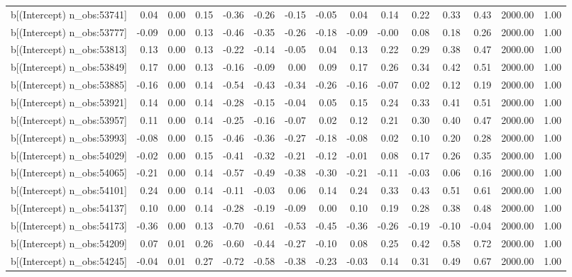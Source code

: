 \begin{table}[ht]
\begin{tabular}{rrrrrrrrrrrrrrr}
  b[(Intercept) n\_obs:53741] & 0.04 & 0.00 & 0.15 & -0.36 & -0.26 & -0.15 & -0.05 & 0.04 & 0.14 & 0.22 & 0.33 & 0.43 & 2000.00 & 1.00 \\ 
  b[(Intercept) n\_obs:53777] & -0.09 & 0.00 & 0.13 & -0.46 & -0.35 & -0.26 & -0.18 & -0.09 & -0.00 & 0.08 & 0.18 & 0.26 & 2000.00 & 1.00 \\ 
  b[(Intercept) n\_obs:53813] & 0.13 & 0.00 & 0.13 & -0.22 & -0.14 & -0.05 & 0.04 & 0.13 & 0.22 & 0.29 & 0.38 & 0.47 & 2000.00 & 1.00 \\ 
  b[(Intercept) n\_obs:53849] & 0.17 & 0.00 & 0.13 & -0.16 & -0.09 & 0.00 & 0.09 & 0.17 & 0.26 & 0.34 & 0.42 & 0.51 & 2000.00 & 1.00 \\ 
  b[(Intercept) n\_obs:53885] & -0.16 & 0.00 & 0.14 & -0.54 & -0.43 & -0.34 & -0.26 & -0.16 & -0.07 & 0.02 & 0.12 & 0.19 & 2000.00 & 1.00 \\ 
  b[(Intercept) n\_obs:53921] & 0.14 & 0.00 & 0.14 & -0.28 & -0.15 & -0.04 & 0.05 & 0.15 & 0.24 & 0.33 & 0.41 & 0.51 & 2000.00 & 1.00 \\ 
  b[(Intercept) n\_obs:53957] & 0.11 & 0.00 & 0.14 & -0.25 & -0.16 & -0.07 & 0.02 & 0.12 & 0.21 & 0.30 & 0.40 & 0.47 & 2000.00 & 1.00 \\ 
  b[(Intercept) n\_obs:53993] & -0.08 & 0.00 & 0.15 & -0.46 & -0.36 & -0.27 & -0.18 & -0.08 & 0.02 & 0.10 & 0.20 & 0.28 & 2000.00 & 1.00 \\ 
  b[(Intercept) n\_obs:54029] & -0.02 & 0.00 & 0.15 & -0.41 & -0.32 & -0.21 & -0.12 & -0.01 & 0.08 & 0.17 & 0.26 & 0.35 & 2000.00 & 1.00 \\ 
  b[(Intercept) n\_obs:54065] & -0.21 & 0.00 & 0.14 & -0.57 & -0.49 & -0.38 & -0.30 & -0.21 & -0.11 & -0.03 & 0.06 & 0.16 & 2000.00 & 1.00 \\ 
  b[(Intercept) n\_obs:54101] & 0.24 & 0.00 & 0.14 & -0.11 & -0.03 & 0.06 & 0.14 & 0.24 & 0.33 & 0.43 & 0.51 & 0.61 & 2000.00 & 1.00 \\ 
  b[(Intercept) n\_obs:54137] & 0.10 & 0.00 & 0.14 & -0.28 & -0.19 & -0.09 & 0.00 & 0.10 & 0.19 & 0.28 & 0.38 & 0.48 & 2000.00 & 1.00 \\ 
  b[(Intercept) n\_obs:54173] & -0.36 & 0.00 & 0.13 & -0.70 & -0.61 & -0.53 & -0.45 & -0.36 & -0.26 & -0.19 & -0.10 & -0.04 & 2000.00 & 1.00 \\ 
  b[(Intercept) n\_obs:54209] & 0.07 & 0.01 & 0.26 & -0.60 & -0.44 & -0.27 & -0.10 & 0.08 & 0.25 & 0.42 & 0.58 & 0.72 & 2000.00 & 1.00 \\ 
  b[(Intercept) n\_obs:54245] & -0.04 & 0.01 & 0.27 & -0.72 & -0.58 & -0.38 & -0.23 & -0.03 & 0.14 & 0.31 & 0.49 & 0.67 & 2000.00 & 1.00 \\ 

\end{tabular}
\end{table}
